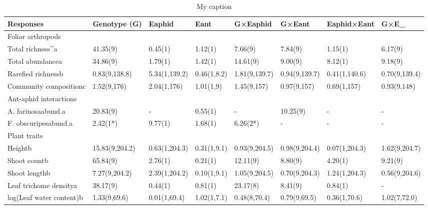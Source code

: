 \begin{table}[]
\centering
\caption{My caption}
\label{my-label}
\begin{tabular}{@{}llllllll@{}}
\toprule
Responses                        & Genotype (G)   & Eaphid        & Eant        & G×Eaphid      & G×Eant        & Eaphid×Eant   & G×E_{aphid×Eant \\ \midrule
Foliar arthropods                &                &               &             &               &               &               &               \\
Total richness\textasciicircum a & 41.35(9)       & 0.45(1)       & 1.12(1)     & 7.66(9)       & 7.84(9)       & 1.15(1)       & 6.17(9)       \\
Total abundancea                 & 34.86(9)       & 1.79(1)       & 1.42(1)     & 14.61(9)      & 9.00(9)       & 8.12(1)       & 9.18(9)       \\
Rarefied richnessb               & 0.83(9,138.8)  & 5.34(1,139.2) & 0.46(1,8.2) & 1.81(9,139.7) & 0.94(9,139.7) & 0.41(1,140.6) & 0.70(9,139.4) \\
Community compositionc           & 1.52(9,176)    & 2.04(1,176)   & 1.01(1,9)   & 1.45(9,157)   & 0.97(9,157)   & 0.69(1,157)   & 0.93(9,148)   \\
Ant-aphid interactions           &                &               &             &               &               &               &               \\
A. farinosaabund.a               & 20.83(9)       & -             & 0.55(1)     & -             & 10.25(9)      & -             & -             \\
F. obscuripesabund.a             & 2.42(1*)       & 9.77(1)       & 1.68(1)     & 6.26(2*)      & -             & -             & -             \\
Plant traits                     &                &               &             &               &               &               &               \\
Heightb                          & 15.83(9,204.2) & 0.63(1,204.3) & 0.31(1,9.1) & 0.93(9,204.5) & 0.98(9,204.4) & 0.07(1,204.3) & 1.62(9,204.7) \\
Shoot countb                     & 65.84(9)       & 2.76(1)       & 0.21(1)     & 12.11(9)      & 8.80(9)       & 4.20(1)       & 9.21(9)       \\
Shoot lengthb                    & 7.27(9,204.2)  & 2.39(1,204.2) & 0.10(1,9.1) & 1.05(9,204.5) & 0.70(9,204.3) & 1.24(1,204.3) & 0.56(9,204.6) \\
Leaf trichome densitya           & 38.17(9)       & 0.44(1)       & 0.81(1)     & 23.17(8)      & 8.41(9)       & 0.84(1)       & -             \\
log(Leaf water content)b         & 1.33(9,69.6)   & 0.01(1,69.4)  & 1.02(1,7.1) & 0.48(8,70.4)  & 0.79(9,69.5)  & 0.36(1,70.6)  & 1.02(7,72.0)  \\ \bottomrule
\end{tabular}
\end{table}